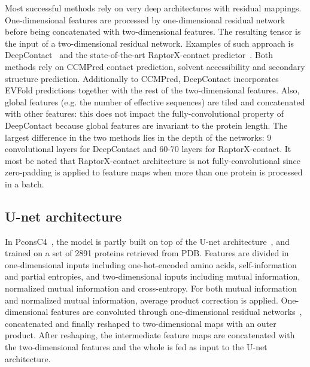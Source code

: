         Most successful methods rely on very deep architectures with residual mappings.
        One-dimensional features are processed by one-dimensional residual network
        before being concatenated with two-dimensional features. The resulting tensor
        is the input of a two-dimensional residual network.
        Examples of such approach is DeepContact~\cite{DeepContact} and the state-of-the-art
        RaptorX-contact predictor~\cite{DeepContact}. Both methods rely on CCMPred contact
        prediction, solvent accessibility and secondary structure prediction.
        Additionally to CCMPred, DeepContact incorporates EVFold predictions together
        with the rest of the two-dimensional features. Also, global features (e.g. the number
        of effective sequences) are tiled and concatenated with other features: this does
        not impact the fully-convolutional property of DeepContact because global features
        are invariant to the protein length. 
        The largest difference in the two methods lies in the depth of the networks:
        9 convolutional layers for DeepContact and 60-70 layers for RaptorX-contact.
        It most be noted that RaptorX-contact architecture is not fully-convolutional
        since zero-padding is applied to feature maps when more than one protein
        is processed in a batch.

    \subsection{U-net architecture}

        In PconsC4~\cite{Michel383133}, the model is partly built on top of the U-net
        architecture~\cite{DBLP:journals/corr/RonnebergerFB15}, and trained on a set
        of 2891 proteins retrieved from PDB. Features are divided in one-dimensional
        inputs including one-hot-encoded amino acids, self-information and
        partial entropies, and two-dimensional inputs including mutual information,
        normalized mutual information and cross-entropy.
        For both mutual information and normalized mutual information,
        average product correction is applied.
        One-dimensional features are convoluted through one-dimensional residual networks~,
        concatenated and finally reshaped to two-dimensional maps with an outer product.
        After reshaping, the intermediate feature maps are concatenated with the
        two-dimensional features and the whole is fed as input to the U-net architecture.


